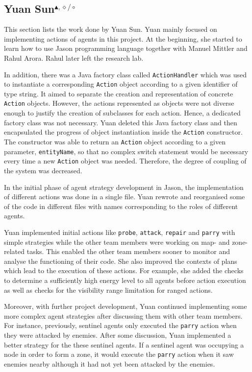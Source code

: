 \subsection[Yuan Sun]{Yuan Sun$^{\blacktriangle,\diamond/\circ}$}\label{org:sun}
This section lists the work done by Yuan Sun.
Yuan mainly focused on implementing actions of agents in this project.
At the beginning, she started to learn how to use Jason programming language together with Manuel Mittler and Rahul Arora.
Rahul later left the research lab. %

In addition, there was a Java factory class called \texttt{ActionHandler} which was used to instantiate a corresponding \texttt{Action} object according to a given identifier of type string.
It aimed to separate the creation and representation of concrete \texttt{Action} objects.
However, the actions represented as objects were not diverse enough to justify the creation of subclasses for each action.
Hence, a dedicated factory class was not necessary.
Yuan deleted this Java factory class and then encapsulated the progress of object instantiation inside the \texttt{Action} constructor.
The constructor was able to return an \texttt{Action} object according to a given parameter, \texttt{entityName}, so that no complex switch statement would be necessary every time a new \texttt{Action} object was needed.
Therefore, the degree of coupling of the system was decreased.

In the initial phase of agent strategy development in Jason, the implementation of different actions was done in a single file.
Yuan rewrote and reorganised some of the code in different files with names corresponding to the roles of different agents.

Yuan implemented initial actions like \texttt{probe}, \texttt{attack}, \texttt{repair} and \texttt{parry} with simple strategies while the other team members were working on map- and zone-related tasks.
This enabled the other team members sooner to monitor and analyse the functioning of their code.
She also improved the contexts of plans which lead to the execution of these actions.
For example, she added the checks to determine a sufficiently high energy level to all agents before action execution as well as checks for the visibility range limitation for ranged actions.

Moreover, with further project development, Yuan continued implementing some more complex agent strategies after discussing them with other team members.
For instance, previously, sentinel agents only executed the \texttt{parry} action when they were attacked by enemies.
After some discussion, Yuan implemented a better strategy for the these sentinel agents.
If a sentinel agent was occupying a node in order to form a zone, it would execute the \texttt{parry} action when it saw enemies nearby although it had not yet been attacked by the enemies.

